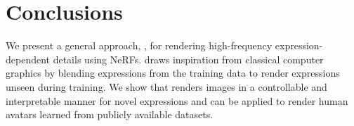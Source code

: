 \section{Conclusions}
  \label{sec:blendfields-conclusion}
  We present a general approach, \blendfields, for rendering high-frequency
  expression-dependent details using NeRFs.
  \blendfields draws inspiration from classical computer graphics by blending expressions from the training data to render expressions unseen during training.
  We show that \blendfields renders images in a controllable and interpretable
  manner for novel expressions and can be applied to render human avatars
  learned from publicly available datasets.

